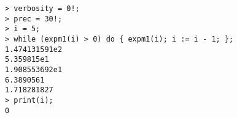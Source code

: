 \begin{center}\begin{minipage}{15cm}\begin{Verbatim}[frame=single]
> verbosity = 0!;
> prec = 30!;
> i = 5;
> while (expm1(i) > 0) do { expm1(i); i := i - 1; };
1.474131591e2
5.359815e1
1.908553692e1
6.3890561
1.718281827
> print(i);
0
\end{Verbatim}
\end{minipage}\end{center}
